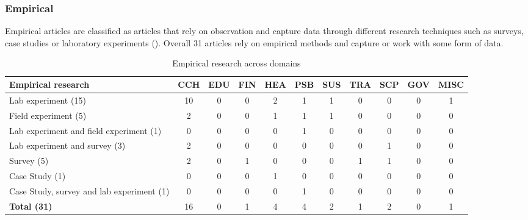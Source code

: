 \subsubsection{Empirical}
Empirical articles are classified as articles that rely on observation and capture data through different research techniques such as surveys, case studies or laboratory experiments (\cite{alavi_review_1992}). Overall 31 articles rely on empirical methods and capture or work with some form of data.

\begin{table}[htbp]
\small
\centering
\begin{tabular}{|p{}|cccccccccc|}
\hline
\textbf{Empirical research} & \textbf{CCH} & \textbf{EDU} & \textbf{FIN} & \textbf{HEA} & \textbf{PSB} & \textbf{SUS} & \textbf{TRA} & \textbf{SCP} & \textbf{GOV} & \textbf{MISC} \\ \hline
Lab experiment (15) & 10 & 0 & 0 & 2 & 1 & 1 & 0 & 0 & 0 & 1 \\
Field experiment (5) & 2 & 0 & 0 & 1 & 1 & 1 & 0 & 0 & 0 & 0 \\
Lab experiment and field experiment (1) & 0 & 0 & 0 & 0 & 1 & 0 & 0 & 0 & 0 & 0 \\
Lab experiment and survey (3) & 2 & 0 & 0 & 0 & 0 & 0 & 0 & 1 & 0 & 0 \\
Survey (5) & 2 & 0 & 1 & 0 & 0 & 0 & 1 & 1 & 0 & 0 \\
Case Study (1) & 0 & 0 & 0 & 1 & 0 & 0 & 0 & 0 & 0 & 0 \\
Case Study, survey and lab experiment (1) & 0 & 0 & 0 & 0 & 1 & 0 & 0 & 0 & 0 & 0 \\ \hline
\textbf{Total (31)} & 16 & 0 & 1 & 4 & 4 & 2 & 1 & 2 & 0 & 1 \\ \hline
\end{tabular}
\caption{Empirical research across domains}
\label{table:empirical}
\end{table}


